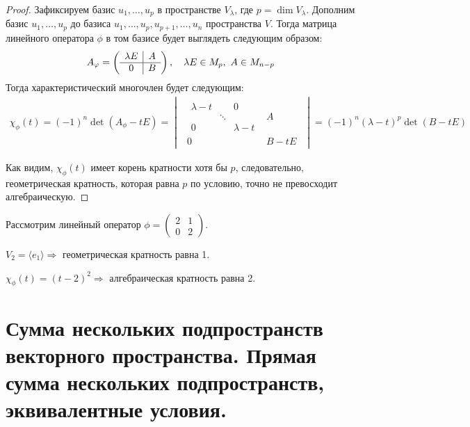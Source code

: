 \begin{proof}
	Зафиксируем базис $u_1, \ldots, u_p$ в пространстве $V_\lambda$, где $p = \dim{V_\lambda}$. Дополним базис $u_1, \ldots, u_p$ до базиса $u_1, \ldots, u_p, u_{p+1}, \ldots, u_n$ пространства $V$. Тогда матрица линейного оператора $\phi$ в 
	том базисе будет выглядеть следующим образом:
	\begin{gather*}
	A_\phi = 
		\begin{pmatrix*}
		\begin{array}{c|c}
		\l E & A \\ \hline
		0 & B
		\end{array}
		\end{pmatrix*}, \quad \lambda E \in M_p,\ A \in M_{n-p}
	\end{gather*}
	Тогда характеристический многочлен будет следующим:
	\begin{gather*}
	\chi_\phi(t) = (-1)^n \det (A_\phi - tE) = 
	\begin{vmatrix}
	\begin{array}{c|c}
	\begin{matrix}
	\lambda - t &  & 0 \\
	& \ddots &  \\
	0 &  & \lambda - t
	\end{matrix}
	& A \\ \hline
	0 & B - tE
	\end{array}
	\end{vmatrix}
	= (-1)^n(\lambda - t)^p\det(B - tE)
	\end{gather*}

	Как видим, $\chi_\phi(t)$ имеет корень кратности хотя бы $p$, следовательно, геометрическая кратность, которая равна $p$ по условию, точно не превосходит алгебраическую.
\end{proof}

\begin{Examples} Рассмотрим линейный оператор $\phi = \begin{pmatrix}
    2& 1 \\
    0& 2
    \end{pmatrix}$.

    $V_2 = \langle e_1\rangle \Rightarrow$ геометрическая кратность равна 1.

    $\chi_\phi(t) = (t-2)^2 \Rightarrow$ алгебраическая кратность равна 2.
\end{Examples}

\section{Сумма нескольких подпространств векторного пространства. Прямая сумма нескольких подпространств, эквивалентные условия.}

